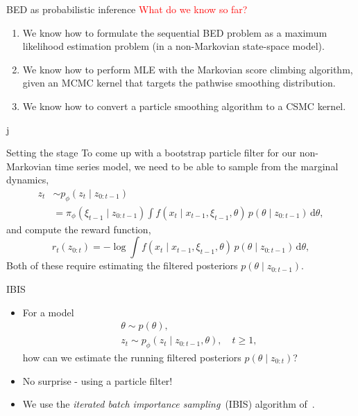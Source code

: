 \documentclass[10pt, aspectratio=1610]{beamer}
\newcommand{\dd}{\mathrm{d}}
\begin{document}
    \begin{frame}{BED as probabilistic inference}
      \textcolor{red}{\large What do we know so far?}\vspace{0.1cm}
      \begin{enumerate}
        \item<2-> We know how to formulate the sequential BED problem as a maximum likelihood estimation problem (in a non-Markovian state-space model).
        \item<3-> We know how to perform MLE with the Markovian score climbing algorithm, given an MCMC kernel that targets the pathwise smoothing distribution.
        \item<4-> We know how to convert a particle smoothing algorithm to a CSMC kernel.
      \end{enumerate}

      \vspace{0.3cm}
    \end{frame}

  j
    \begin{frame}{Setting the stage}
      To come up with a bootstrap particle filter for our non-Markovian time series model, we need to be able to sample from the marginal dynamics,
      \begin{align}
        z_t &\sim p_\phi(z_t \mid z_{0:t-1}) \\
        &= \pi_\phi(\xi_{t-1} \mid z_{0:t-1}) \int f(x_t \mid x_{t-1}, \xi_{t-1}, \theta) \, p(\theta \mid z_{0:t-1}) \, \dd \theta,
      \end{align}
      and compute the reward function,
      \begin{equation}
        r_t(z_{0:t}) = - \log \int f(x_t \mid x_{t-1}, \xi_{t-1}, \theta) \, p(\theta \mid z_{0:t-1}) \, \dd \theta,
      \end{equation}
      \pause
      Both of these require estimating the filtered posteriors $p(\theta \mid z_{0:t-1})$.
    \end{frame}

    \begin{frame}{IBIS}
      \begin{itemize}[<+->]
        \item For a model
          \begin{gather}
            \theta \sim p(\theta), \\
            z_t \sim p_\phi(z_t \mid z_{0:t-1}, \theta), \quad t \geq 1,
          \end{gather}
          how can we estimate the running filtered posteriors $p(\theta \mid z_{0:t})$?
        \item No surprise - using a particle filter!
        \item We use the \emph{iterated batch importance sampling}~(IBIS) algorithm of~\citet{chopin2002sequential}.
      \end{itemize}
    \end{frame}
\end{document}
